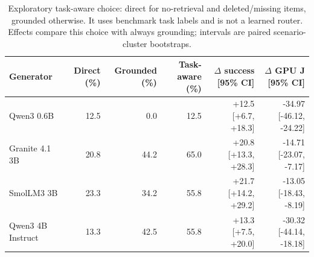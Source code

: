 \begin{table}[t]
\caption{Exploratory task-aware choice: direct for no-retrieval and deleted/missing items, grounded otherwise. It uses benchmark task labels and is not a learned router. Effects compare this choice with always grounding; intervals are paired scenario-cluster bootstraps.}
\label{tab:task-oracle}
\centering
\small
\begin{tabular}{@{}lrrrrr@{}}
\toprule
Generator & Direct (\%) & Grounded (\%) & Task-aware (\%) & $\Delta$ success [95\% CI] & $\Delta$ GPU J [95\% CI] \\
\midrule
Qwen3 0.6B & 12.5 & 0.0 & 12.5 & +12.5 [+6.7, +18.3] & -34.97 [-46.12, -24.22] \\
Granite 4.1 3B & 20.8 & 44.2 & 65.0 & +20.8 [+13.3, +28.3] & -14.71 [-23.07, -7.17] \\
SmolLM3 3B & 23.3 & 34.2 & 55.8 & +21.7 [+14.2, +29.2] & -13.05 [-18.43, -8.19] \\
Qwen3 4B Instruct & 13.3 & 42.5 & 55.8 & +13.3 [+7.5, +20.0] & -30.32 [-44.14, -18.18] \\
\bottomrule
\end{tabular}
\end{table}
